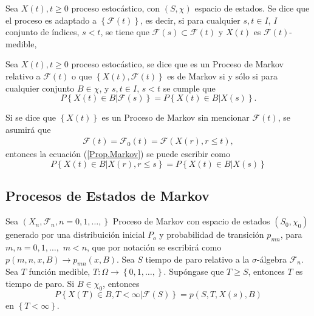 \begin{Def}
Sea $X\left(t\right),t\geq0$ proceso estoc\'astico, con
$\left(S,\chi\right)$ espacio de estados. Se dice que el proceso
es adaptado a $\left\{\mathcal{F}\left(t\right)\right\}$, es
decir, si para cualquier $s,t\in I$, $I$ conjunto de \'indices,
$s<t$, se tiene que
$\mathcal{F}\left(s\right)\subset\mathcal{F}\left(t\right)$ y
$X\left(t\right)$ es $\mathcal{F}\left(t\right)$-medible,
\end{Def}

\begin{Def}
Sea $X\left(t\right),t\geq0$ proceso estoc\'astico, se dice que es
un Proceso de Markov relativo a $\mathcal{F}\left(t\right)$ o que
$\left\{X\left(t\right),\mathcal{F}\left(t\right)\right\}$ es de
Markov si y s\'olo si para cualquier conjunto $B\in\chi$,  y
$s,t\in I$, $s<t$ se cumple que
\begin{equation}\label{Prop.Markov}
P\left\{X\left(t\right)\in
B|\mathcal{F}\left(s\right)\right\}=P\left\{X\left(t\right)\in
B|X\left(s\right)\right\}.
\end{equation}
\end{Def}
\begin{Note}
Si se dice que $\left\{X\left(t\right)\right\}$ es un Proceso de
Markov sin mencionar $\mathcal{F}\left(t\right)$, se asumir\'a que
\begin{eqnarray*}
\mathcal{F}\left(t\right)=\mathcal{F}_{0}\left(t\right)=\mathcal{F}\left(X\left(r\right),r\leq
t\right),
\end{eqnarray*}
entonces la ecuaci\'on (\ref{Prop.Markov}) se puede escribir como
\begin{equation}
P\left\{X\left(t\right)\in B|X\left(r\right),r\leq s\right\} =
P\left\{X\left(t\right)\in B|X\left(s\right)\right\}
\end{equation}
\end{Note}
\subsection{Procesos de Estados de Markov}

\begin{Teo}
Sea $\left(X_{n},\mathcal{F}_{n},n=0,1,\ldots,\right\}$ Proceso de
Markov con espacio de estados $\left(S_{0},\chi_{0}\right)$
generado por una distribuici\'on inicial $P_{o}$ y probabilidad de
transici\'on $p_{mn}$, para $m,n=0,1,\ldots,$ $m<n$, que por
notaci\'on se escribir\'a como $p\left(m,n,x,B\right)\rightarrow
p_{mn}\left(x,B\right)$. Sea $S$ tiempo de paro relativo a la
$\sigma$-\'algebra $\mathcal{F}_{n}$. Sea $T$ funci\'on medible,
$T:\Omega\rightarrow\left\{0,1,\ldots,\right\}$. Sup\'ongase que
$T\geq S$, entonces $T$ es tiempo de paro. Si $B\in\chi_{0}$,
entonces
\begin{equation}\label{Prop.Fuerte.Markov}
P\left\{X\left(T\right)\in
B,T<\infty|\mathcal{F}\left(S\right)\right\} =
p\left(S,T,X\left(s\right),B\right)
\end{equation}
en $\left\{T<\infty\right\}$.
\end{Teo}


